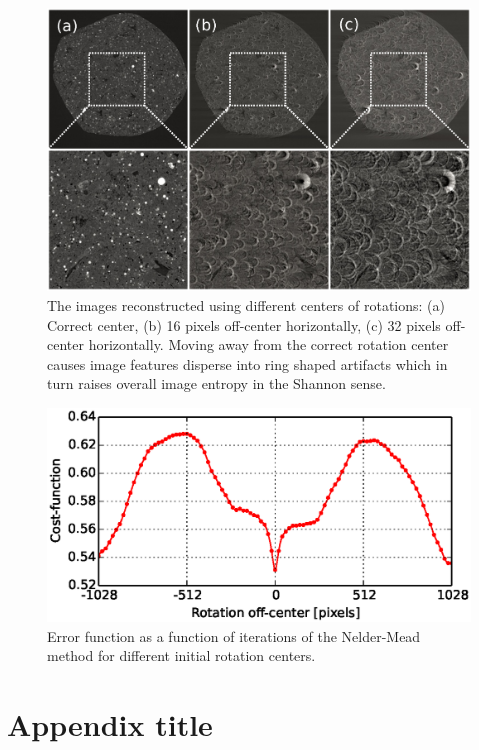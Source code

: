 \documentclass[pdf]{iucr}              %
\begin{document}
\begin{figure}
\centering
\includegraphics[width=\textwidth]{fig_center1.eps}
\caption{The images reconstructed using different centers of rotations: (a) Correct center, (b) 16 pixels  off-center horizontally, (c) 32 pixels off-center horizontally. Moving away from the correct rotation center causes image features disperse into ring shaped artifacts which in turn raises overall image entropy in the Shannon sense.}
\label{fig:OptimizeCenter1}
\end{figure}

\begin{figure}
\centering
\includegraphics[width=\textwidth]{fig_center2.eps}
\caption{Error function as a function of iterations of the Nelder-Mead method for different initial rotation centers. }
\label{fig:OptimizeCenter2}
\end{figure}


\appendix
\section{Appendix title}
\end{document}
